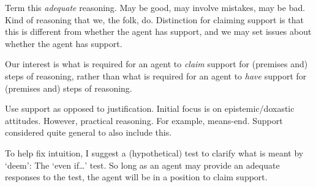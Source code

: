 \begin{note}
  Term this \emph{adequate} reasoning.
  May be good, may involve mistakes, may be bad.
  Kind of reasoning that we, the folk, do.
  Distinction for claiming support is that this is different from whether the agent has support, and we may set issues about whether the agent has support.

  Our interest is what is required for an agent to \emph{claim} support for (premises and) steps of reasoning, rather than what is required for an agent to \emph{have} support for (premises and) steps of reasoning.

  Use support as opposed to justification.
  Initial focus is on epistemic/doxastic attitudes.
  However, practical reasoning.
  For example, means-end.
  Support considered quite general to also include this.
\end{note}




\begin{note}
  To help fix intuition, I suggest a (hypothetical) test to clarify what is meant by `deem': The `even if\dots' test.
  So long as an agent may provide an adequate responses to the test, the agent will be in a position to claim support.
\end{note}

